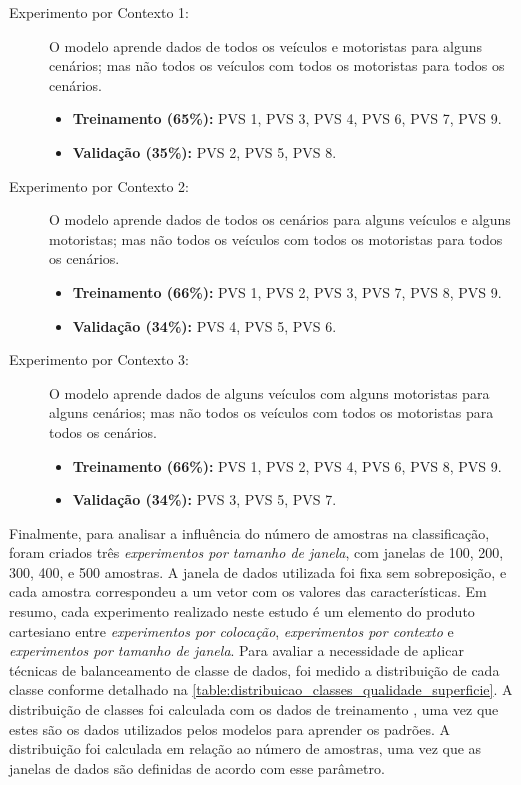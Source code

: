 \begin{description}
	
	\item[Experimento por Contexto 1:] O modelo aprende dados de todos os veículos e motoristas para alguns cenários; mas não todos os veículos com todos os motoristas para todos os cenários.
    \begin{itemize}
        \item \textbf{Treinamento (65\%):} PVS 1, PVS 3, PVS 4, PVS 6, PVS 7, PVS 9. 
        \item \textbf{Validação (35\%):} PVS 2, PVS 5, PVS 8.
    \end{itemize}
    
    \item[Experimento por Contexto 2:] O modelo aprende dados de todos os cenários para alguns veículos e alguns motoristas; mas não todos os veículos com todos os motoristas para todos os cenários.
    \begin{itemize}
        \item \textbf{Treinamento (66\%):} PVS 1, PVS 2, PVS 3, PVS 7, PVS 8, PVS 9.
        \item \textbf{Validação (34\%):} PVS 4, PVS 5, PVS 6.
    \end{itemize}
    
    \item[Experimento por Contexto 3:] O modelo aprende dados de alguns veículos com alguns motoristas para alguns cenários; mas não todos os veículos com todos os motoristas para todos os cenários.
    \begin{itemize}
        \item \textbf{Treinamento (66\%):} PVS 1, PVS 2, PVS 4, PVS 6, PVS 8, PVS 9.
        \item \textbf{Validação (34\%):} PVS 3, PVS 5, PVS 7.
    \end{itemize}
    
\end{description}

Finalmente, para analisar a influência do número de amostras na classificação, foram criados três \emph{experimentos por tamanho de janela}, com janelas de 100, 200, 300, 400, e 500 amostras. A janela de dados utilizada foi fixa sem sobreposição, e cada amostra correspondeu a um vetor com os valores das características. Em resumo, cada experimento realizado neste estudo é um elemento do produto cartesiano entre \emph{experimentos por colocação}, \emph{experimentos por contexto} e \emph{experimentos por tamanho de janela}. Para avaliar a necessidade de aplicar técnicas de balanceamento de classe de dados, foi medido a distribuição de cada classe conforme detalhado na \autoref{table:distribuicao_classes_qualidade_superficie}. A distribuição de classes foi calculada com os dados de treinamento \cite{He2013,Kuhn2013}, uma vez que estes são os dados utilizados pelos modelos para aprender os padrões. A distribuição foi calculada em relação ao número de amostras, uma vez que as janelas de dados são definidas de acordo com esse parâmetro.

